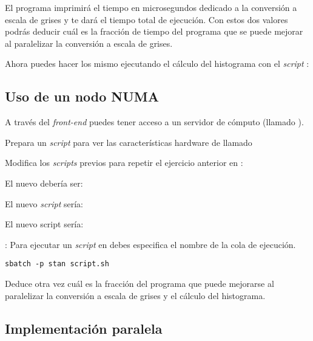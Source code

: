 El programa imprimirá el tiempo en microsegundos dedicado a la conversión a
escala de grises y  te dará el tiempo total de ejecución.
Con estos dos valores podrás deducir cuál es la fracción de tiempo del programa
que se puede mejorar al paralelizar la conversión a escala de grises.

Ahora puedes hacer los mismo ejecutando el cálculo del histograma con el
\emph{script} :


\subsection{Uso de un nodo NUMA}

A través del \emph{front-end}  puedes tener acceso a un
servidor de cómputo (llamado ).

Prepara un \emph{script} para ver las características hardware de
 llamado 



Modifica los \emph{scripts} previos para repetir el ejercicio anterior en
:

El nuevo  debería ser:



El nuevo \emph{script}  sería:



El nuevo script  sería:



: 
Para ejecutar un \emph{script} en  debes especifica el nombre de
la cola de ejecución.

\begin{lstlisting}[style=terminal]
sbatch -p stan script.sh
\end{lstlisting}

Deduce otra vez cuál es la fracción del programa que puede mejorarse al
paralelizar la conversión a escala de grises y el cálculo del histograma.

\subsection{Implementación paralela}

